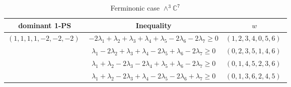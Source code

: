 \documentclass[11pt]{article}
\begin{document}
 
 \begin{longtable}[l]{|c|c|c|} 
 \caption{Ferminonic case $\wedge^{3}\mathbb{C}^{7}$} \\  
 
 \hline 
 \textrm{dominant 1-PS} & \textrm{Inequality} & $w$ \\ 
 \hline\multirow[t]{4}{*}{ $(1 ,1 ,1 ,1 ,-2 ,-2 ,-2) \;$ }  & $-2\lambda_{1} + \lambda_{2} + \lambda_{3} + \lambda_{4} + \lambda_{5}-2\lambda_{6}-2\lambda_{7}\geq 0$ & $(1 ,2 ,3 ,4 ,0 ,5 ,6) \;$\\ 
 \cline{2-3} 
 & $\lambda_{1}-2\lambda_{2} + \lambda_{3} + \lambda_{4}-2\lambda_{5} + \lambda_{6}-2\lambda_{7}\geq 0$ & $(0 ,2 ,3 ,5 ,1 ,4 ,6) \;$\\ 
 \cline{2-3} 
 & $\lambda_{1} + \lambda_{2}-2\lambda_{3}-2\lambda_{4} + \lambda_{5} + \lambda_{6}-2\lambda_{7}\geq 0$ & $(0 ,1 ,4 ,5 ,2 ,3 ,6) \;$\\ 
 \cline{2-3} 
 & $\lambda_{1} + \lambda_{2}-2\lambda_{3} + \lambda_{4}-2\lambda_{5}-2\lambda_{6} + \lambda_{7}\geq 0$ & $(0 ,1 ,3 ,6 ,2 ,4 ,5) \;$\\ \hline
  
 \end{longtable} 
 
\end{document}
